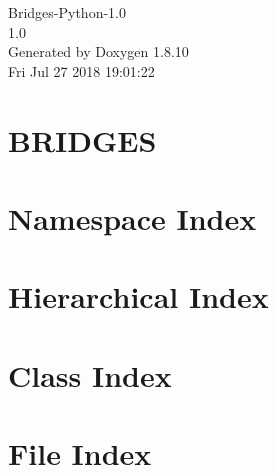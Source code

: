 \documentclass[twoside]{book}
\newcommand{\+}{\discretionary{\mbox{\scriptsize$\hookleftarrow$}}{}{}}
\newcommand{\clearemptydoublepage}{%
  \newpage{\pagestyle{empty}\cleardoublepage}%
}
\begin{document}
\hypersetup{pageanchor=false,
             bookmarks=true,
             bookmarksnumbered=true,
             pdfencoding=unicode
            }
\begin{titlepage}
\vspace*{7cm}
\begin{center}%
{\Large Bridges-\/\+Python-\/1.0 \\[1ex]\large 1.\+0 }\\
\vspace*{1cm}
{\large Generated by Doxygen 1.8.10}\\
\vspace*{0.5cm}
{\small Fri Jul 27 2018 19:01:22}\\
\end{center}
\end{titlepage}
\clearemptydoublepage
\tableofcontents
\clearemptydoublepage
{}
\hypersetup{pageanchor=true}

\chapter{B\+R\+I\+D\+G\+E\+S}
\label{index}\hypertarget{index}{}
\chapter{Namespace Index}

\chapter{Hierarchical Index}

\chapter{Class Index}

\chapter{File Index}

\end{document}
